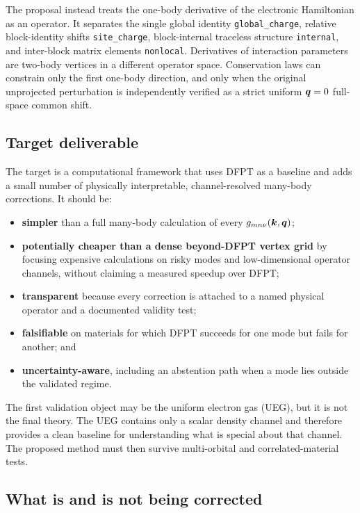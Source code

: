 The proposal instead treats the one-body derivative of the electronic Hamiltonian
as an operator.  It separates the single global identity
\texttt{global\_charge}, relative block-identity shifts
\texttt{site\_charge}, block-internal traceless structure
\texttt{internal}, and inter-block matrix elements \texttt{nonlocal}.
Derivatives of interaction parameters are two-body vertices in a different
operator space.  Conservation laws can constrain only the first one-body
direction, and only when the original unprojected perturbation is independently
verified as a strict uniform $\bm{q}=0$ full-space common shift.

\subsection{Target deliverable}

The target is a computational framework that uses DFPT as a baseline and adds a
small number of physically interpretable, channel-resolved many-body corrections.
It should be:

\begin{itemize}
  \item \textbf{simpler} than a full many-body calculation of every
  $g_{mn\nu}(\bm{k},\bm{q})$;
  \item \textbf{potentially cheaper than a dense beyond-DFPT vertex grid} by
  focusing expensive calculations on risky modes and low-dimensional operator
  channels, without claiming a measured speedup over DFPT;
  \item \textbf{transparent} because every correction is attached to a named
  physical operator and a documented validity test;
  \item \textbf{falsifiable} on materials for which DFPT succeeds for one mode
  but fails for another; and
  \item \textbf{uncertainty-aware}, including an abstention path when a mode lies
  outside the validated regime.
\end{itemize}

The first validation object may be the uniform electron gas (UEG), but it is not
the final theory.  The UEG contains only a scalar density channel and therefore
provides a clean baseline for understanding what is special about that channel.
The proposed method must then survive multi-orbital and correlated-material tests.

\subsection{What is and is not being corrected}

